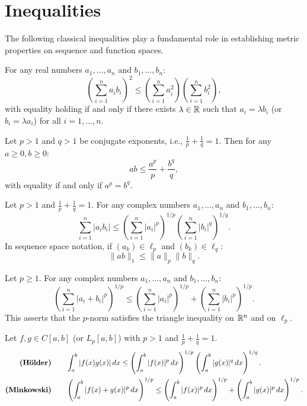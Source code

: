 \section{Inequalities}
\label{sec:inequalities}

The following classical inequalities play a fundamental role in establishing metric properties on sequence and function spaces.

\begin{theorem}
For any real numbers $a_1, \dots, a_n$ and $b_1, \dots, b_n$:
\[
\left( \sum_{i=1}^n a_i b_i \right)^2 \le \left( \sum_{i=1}^n a_i^2 \right) \left( \sum_{i=1}^n b_i^2 \right),
\]
with equality holding if and only if there exists $\lambda \in \mathbb{R}$ such that $a_i = \lambda b_i$ (or $b_i = \lambda a_i$) for all $i=1,\dots,n$.
\end{theorem}

\begin{theorem}
Let $p > 1$ and $q > 1$ be conjugate exponents, i.e., $\frac{1}{p} + \frac{1}{q} = 1$. Then for any $a \ge 0, b \ge 0$:
\[
ab \le \frac{a^p}{p} + \frac{b^q}{q},
\]
with equality if and only if $a^p = b^q$.
\end{theorem}

\begin{theorem}
Let $p > 1$ and $\frac{1}{p} + \frac{1}{q} = 1$. For any complex numbers $a_1, \dots, a_n$ and $b_1, \dots, b_n$:
\[
\sum_{i=1}^n |a_i b_i| \le \left( \sum_{i=1}^n |a_i|^p \right)^{1/p} \left( \sum_{i=1}^n |b_i|^q \right)^{1/q}.
\]
In sequence space notation, if $(a_k) \in \ell_p$ and $(b_k) \in \ell_q$:
\[
\|a b\|_1 \le \|a\|_p \|b\|_q.
\]
\end{theorem}

\begin{theorem}
Let $p \ge 1$. For any complex numbers $a_1, \dots, a_n$ and $b_1, \dots, b_n$:
\[
\left( \sum_{i=1}^n |a_i + b_i|^p \right)^{1/p} \le \left( \sum_{i=1}^n |a_i|^p \right)^{1/p} + \left( \sum_{i=1}^n |b_i|^p \right)^{1/p}.
\]
This asserts that the $p$-norm satisfies the triangle inequality on $\mathbb{R}^n$ and on $\ell_p$.
\end{theorem}

\begin{theorem}
Let $f, g \in C[a,b]$ (or $L_p[a,b]$) with $p > 1$ and $\frac{1}{p} + \frac{1}{q} = 1$.
\begin{align*}
\text{\textbf{(Hölder)}} \qquad &\int_a^b |f(x)g(x)|\,dx \le \left( \int_a^b |f(x)|^p\,dx \right)^{1/p} \left( \int_a^b |g(x)|^q\,dx \right)^{1/q}. \\
\text{\textbf{(Minkowski)}} \qquad &\left( \int_a^b |f(x)+g(x)|^p\,dx \right)^{1/p} \le \left( \int_a^b |f(x)|^p\,dx \right)^{1/p} + \left( \int_a^b |g(x)|^p\,dx \right)^{1/p}.
\end{align*}
\end{theorem}
